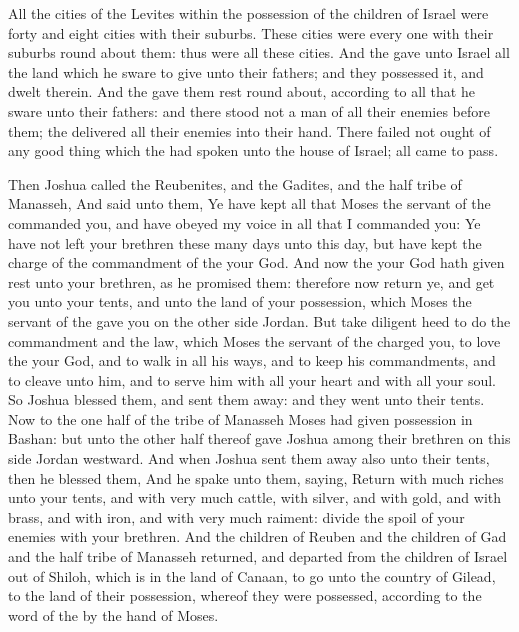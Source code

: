 \begin{biblechapter}
\verse All the cities of the Levites within the possession of the children of Israel were forty and eight cities with their suburbs.
\verse These cities were every one with their suburbs round about them: thus were all these cities.
\verse And the \LORD gave unto Israel all the land which he sware to give unto their fathers; and they possessed it, and dwelt therein.
\verse And the \LORD gave them rest round about, according to all that he sware unto their fathers: and there stood not a man of all their enemies before them; the \LORD delivered all their enemies into their hand.
\verse There failed not ought of any good thing which the \LORD had spoken unto the house of Israel; all came to pass.
\end{biblechapter}

\begin{biblechapter} %
 Then Joshua called the Reubenites, and the Gadites, and the half tribe of Manasseh,
\verse And said unto them, Ye have kept all that Moses the servant of the \LORD commanded you, and have obeyed my voice in all that I commanded you:
\verse Ye have not left your brethren these many days unto this day, but have kept the charge of the commandment of the \LORD your God.
\verse And now the \LORD your God hath given rest unto your brethren, as he promised them: therefore now return ye, and get you unto your tents, and unto the land of your possession, which Moses the servant of the \LORD gave you on the other side Jordan.
\verse But take diligent heed to do the commandment and the law, which Moses the servant of the \LORD charged you, to love the \LORD your God, and to walk in all his ways, and to keep his commandments, and to cleave unto him, and to serve him with all your heart and with all your soul.
\verse So Joshua blessed them, and sent them away: and they went unto their tents.
\verse Now to the one half of the tribe of Manasseh Moses had given possession in Bashan: but unto the other half thereof gave Joshua among their brethren on this side Jordan westward. And when Joshua sent them away also unto their tents, then he blessed them,
\verse And he spake unto them, saying, Return with much riches unto your tents, and with very much cattle, with silver, and with gold, and with brass, and with iron, and with very much raiment: divide the spoil of your enemies with your brethren.
\verse And the children of Reuben and the children of Gad and the half tribe of Manasseh returned, and departed from the children of Israel out of Shiloh, which is in the land of Canaan, to go unto the country of Gilead, to the land of their possession, whereof they were possessed, according to the word of the \LORD by the hand of Moses.

\end{biblechapter}
